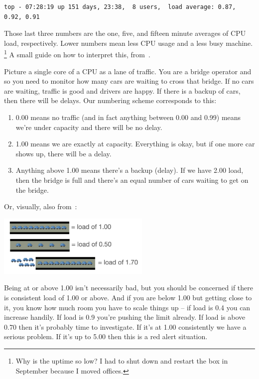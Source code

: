 \documentclass[a4paper]{report}
\begin{document}
\begin{verbatim}
top - 07:28:19 up 151 days, 23:38,  8 users,  load average: 0.87, 0.92, 0.91
\end{verbatim}

Those last three numbers are the one, five, and fifteen minute averages of CPU load, respectively. Lower numbers mean less CPU usage and a less busy machine. \footnote{Why is the uptime so low? I had to shut down and restart the box in September because I moved offices.} A small guide on how to interpret this, from~\cite{scout}.

Picture a single core of a CPU as a lane of traffic. You are a bridge operator and so you need to monitor how many cars are waiting to cross that bridge. If no cars are waiting, traffic is good and drivers are happy. If there is a backup of cars, then there will be delays. Our numbering scheme corresponds to this:

\begin{enumerate}
	\item 0.00 means no traffic (and in fact anything between 0.00 and 0.99) means we're under capacity and there will be no delay.
	\item 1.00 means we are exactly at capacity. Everything is okay, but if one more car shows up, there will be a delay.
	\item Anything above 1.00 means there's a backup (delay). If we have 2.00 load, then the bridge is full and there's an equal number of cars waiting to get on the bridge. 
\end{enumerate}

Or, visually, also from~\cite{scout}:

\begin{center}
	\includegraphics[width=0.55\textwidth]{images/car-analogy.png}
\end{center}

Being at or above 1.00 isn't necessarily bad, but you should be concerned if there is consistent load of 1.00 or above. And if you are below 1.00 but getting close to it, you know how much room you have to scale things up -- if load is 0.4 you can increase handily. If load is 0.9 you're pushing the limit already. If load is above 0.70 then it's probably time to investigate. If it's at 1.00 consistently we have a serious problem. If it's up to 5.00 then this is a red alert situation.
\end{document}
